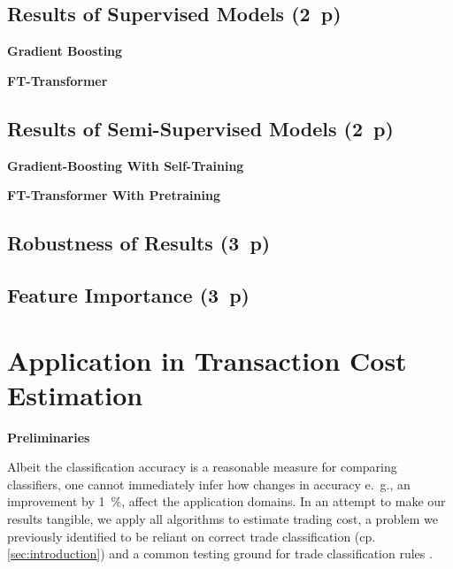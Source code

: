 % 

% 


% 

\subsection{Results of Supervised
    Models (2~p)}\label{sec:results-of-supervised-models}

\textbf{Gradient Boosting}

\textbf{FT-Transformer}

\subsection{Results of Semi-Supervised
    Models (2~p)}\label{sec:results-of-semi-supervised-models}


\textbf{Gradient-Boosting With Self-Training}

\textbf{FT-Transformer With Pretraining}

\subsection{Robustness of Results (3~p)}\label{sec:robustness-checks}

\subsection{Feature Importance (3~p)}\label{sec:feature-importance}


\newpage
\section{Application in Transaction Cost Estimation}\label{sec:application}

\textbf{Preliminaries}


Albeit the classification accuracy is a reasonable measure for comparing classifiers, one cannot immediately infer how changes in accuracy e.~g., an improvement by \SI{1}{\percent}, affect the application domains. In an attempt to make our results tangible, we apply all algorithms to estimate trading cost, a problem we previously identified to be reliant on correct trade classification (cp. \cref{sec:introduction}) and a common testing ground for trade classification rules \autocites[cp.][541]{ellisAccuracyTradeClassification2000}[][569]{finucaneDirectTestMethods2000}[][271--278]{petersonEvaluationBiasesExecution2003}[][896--897]{savickasInferringDirectionOption2003}.

